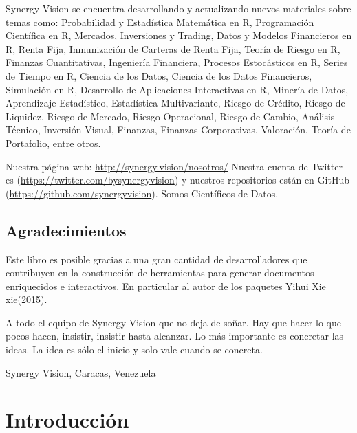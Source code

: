 \documentclass[12pt,]{krantz}
\let\BeginKnitrBlock\begin \let\EndKnitrBlock\end
\begin{document}
Synergy Vision se encuentra desarrollando y actualizando nuevos materiales sobre temas como: Probabilidad y Estadística Matemática en R, Programación Científica en R, Mercados, Inversiones y Trading, Datos y Modelos Financieros en R, Renta Fija, Inmunización de Carteras de Renta Fija, Teoría de Riesgo en R, Finanzas Cuantitativas, Ingeniería Financiera, Procesos Estocásticos en R, Series de Tiempo en R, Ciencia de los Datos, Ciencia de los Datos Financieros, Simulación en R, Desarrollo de Aplicaciones Interactivas en R, Minería de Datos, Aprendizaje Estadístico, Estadística Multivariante, Riesgo de Crédito, Riesgo de Liquidez, Riesgo de Mercado, Riesgo Operacional, Riesgo de Cambio, Análisis Técnico, Inversión Visual, Finanzas, Finanzas Corporativas, Valoración, Teoría de Portafolio, entre otros.

Nuestra página web: \url{http://synergy.vision/nosotros/}
Nuestra cuenta de Twitter es (\url{https://twitter.com/bysynergyvision}) y nuestros repositorios están en GitHub (\url{https://github.com/synergyvision}).
Somos Científicos de Datos.

\hypertarget{agradecimientos}{%
\section*{Agradecimientos}\label{agradecimientos}}


Este libro es posible gracias a una gran cantidad de desarrolladores que contribuyen en la construcción de herramientas para generar documentos enriquecidos e interactivos. En particular al autor de los paquetes Yihui Xie xie(2015).

A todo el equipo de Synergy Vision que no deja de soñar. Hay que hacer lo que pocos hacen, insistir, insistir hasta alcanzar. Lo más importante es concretar las ideas. La idea es sólo el inicio y solo vale cuando se concreta.

\BeginKnitrBlock{flushright}
Synergy Vision, Caracas, Venezuela
\EndKnitrBlock{flushright}

\mainmatter

\hypertarget{introduccion}{%
\chapter{Introducción}\label{introduccion}}
\end{document}

